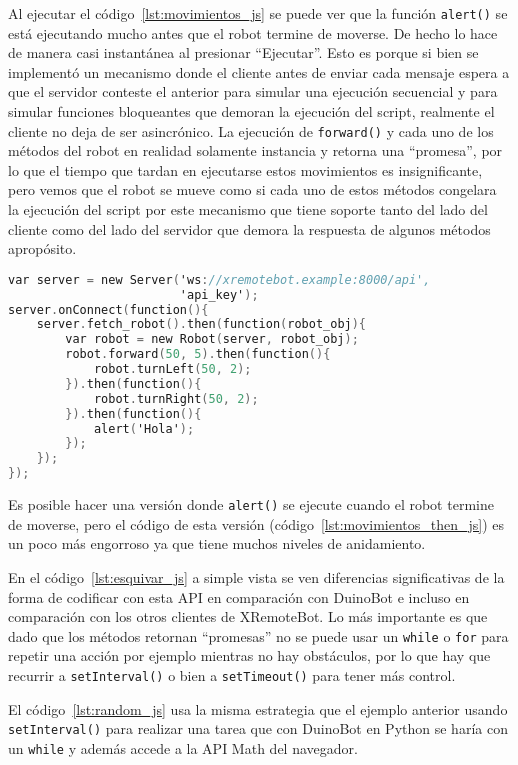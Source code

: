 Al ejecutar el código~\ref{lst:movimientos_js} se puede ver que la
función \texttt{alert()} se está ejecutando mucho antes que el
robot termine de moverse. De hecho lo hace de manera casi instantánea
al presionar ``Ejecutar''. Esto es porque
si bien se implementó un mecanismo donde el cliente
antes de enviar cada mensaje espera a que el servidor conteste el
anterior para simular una ejecución secuencial y para simular
funciones bloqueantes que demoran la ejecución del script, realmente
el cliente no deja de ser asincrónico.
La ejecución de \texttt{forward()} y cada uno de los
métodos del robot en realidad solamente instancia y retorna una
``promesa'', por lo que el tiempo que tardan en ejecutarse
estos movimientos es insignificante, pero vemos que el robot
se mueve como si cada uno de estos métodos congelara la ejecución
del script por este mecanismo que tiene soporte tanto del lado
del cliente como del lado del servidor que demora la respuesta
de algunos métodos apropósito.

\begin{lstlisting}[language=C,
caption={Secuencia de movimientos usando \texttt{Promise\#then()}},
label=lst:movimientos_then_js]
var server = new Server('ws://xremotebot.example:8000/api',
                        'api_key');
server.onConnect(function(){
	server.fetch_robot().then(function(robot_obj){
		var robot = new Robot(server, robot_obj);
        robot.forward(50, 5).then(function(){
            robot.turnLeft(50, 2);
        }).then(function(){
            robot.turnRight(50, 2);
        }).then(function(){
            alert('Hola');
        });
	});
});
\end{lstlisting}

Es posible hacer una versión donde \texttt{alert()} se ejecute cuando
el robot termine de moverse, pero el código de esta versión
(código~\ref{lst:movimientos_then_js}) es
un poco más engorroso ya que tiene muchos niveles de anidamiento.

En el código~\ref{lst:esquivar_js} a simple vista se ven diferencias
significativas de la forma de codificar con esta API en comparación
con DuinoBot e incluso en comparación con los otros clientes de
XRemoteBot. Lo más importante es que dado que los métodos retornan
``promesas'' no se puede usar un \texttt{while} o \texttt{for} para
repetir una acción por ejemplo mientras no hay obstáculos, por lo que
hay que recurrir a \texttt{setInterval()} o bien a \texttt{setTimeout()}
para tener más control.

El código~\ref{lst:random_js} usa la misma estrategia que el ejemplo
anterior usando \texttt{setInterval()} para realizar una tarea
que con DuinoBot en Python se haría con un \texttt{while} y además
accede a la API Math del navegador.

